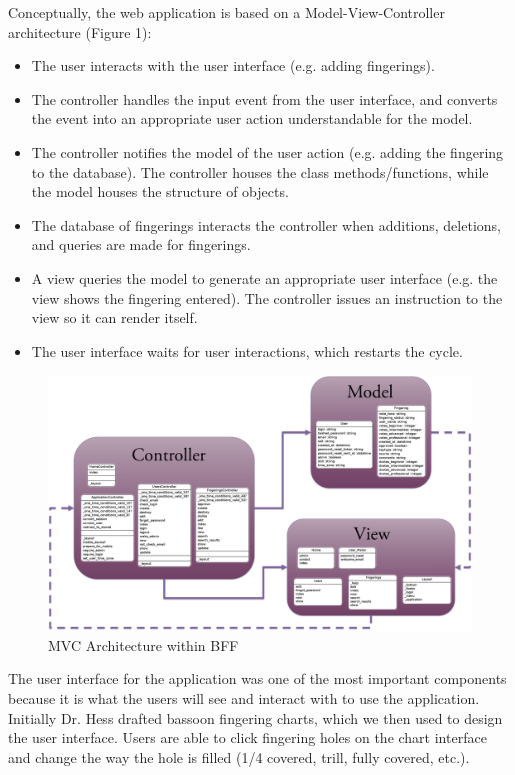 \documentclass[12pt,english]{article}
\begin{document}
Conceptually, the web application is based on a Model-View-Controller
architecture (Figure 1): 
\begin{itemize}
\item The user interacts with the user interface (e.g. adding fingerings). 
\item The controller handles the input event from the user interface, and
converts the event into an appropriate user action understandable
for the model. 
\item The controller notifies the model of the user action (e.g. adding
the fingering to the database). The controller houses the class methods/functions,
while the model houses the structure of objects.
\item The database of fingerings interacts the controller when additions,
deletions, and queries are made for fingerings. 
\item A view queries the model to generate an appropriate user interface
(e.g. the view shows the fingering entered). The controller issues
an instruction to the view so it can render itself.
\item The user interface waits for user interactions, which restarts the
cycle.
\end{itemize}
\begin{figure}[H]


\caption{MVC Architecture within BFF}


\includegraphics[scale=0.15]{MVC}

\end{figure}


The user interface for the application was one of the most important
components because it is what the users will see and interact with
to use the application. Initially Dr. Hess drafted bassoon fingering
charts, which we then used to design the user interface. Users are
able to click fingering holes on the chart interface and change the
way the hole is filled (1/4 covered, trill, fully covered, etc.). 
\end{document}
